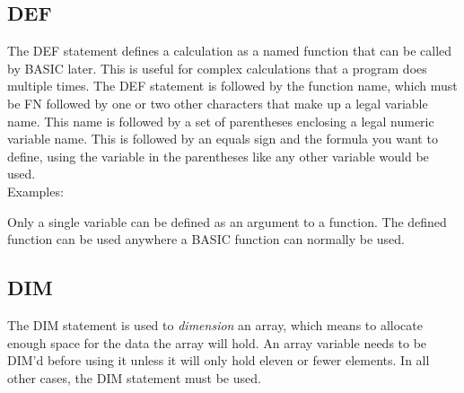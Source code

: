 \subsection{DEF}

The {\ttfamily DEF} statement defines a calculation as a named function that
can be called by BASIC later.  This is useful for complex calculations that a
program does multiple times.  The {\ttfamily DEF} statement is followed by the
function name, which must be {\ttfamily FN} followed by one or two other
characters that make up a legal variable name.  This name is followed by a set
of parentheses enclosing a legal numeric variable name.  This is followed by an
equals sign and the formula you want to define, using the variable in the
parentheses like any other variable would be used.\\

Examples:\\


Only a single variable can be defined as an argument to a function.  The
defined function can be used anywhere a BASIC function can normally be used.\\


\subsection{DIM}

The {\ttfamily DIM} statement is used to \emph{dimension} an array, which means
to allocate enough space for the data the array will hold.  An array variable
needs to be {\ttfamily DIM}'d before using it unless it will only hold eleven
or fewer elements.  In all other cases, the {\ttfamily DIM} statement must be
used.\\

